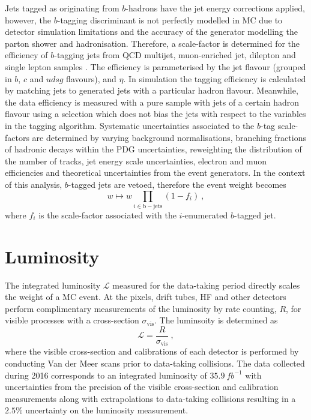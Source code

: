 Jets tagged as originating from $b$-hadrons have the jet energy corrections
applied, however, the $b$-tagging discriminant is not perfectly modelled in MC
due to detector simulation limitations and the accuracy of the generator
modelling the parton shower and hadronisation. Therefore, a scale-factor is
determined for the efficiency of $b$-tagging jets from QCD multijet,
muon-enriched jet, dilepton \Itt and single lepton \Itt samples
\cite{Sirunyan:2017ezt}. The efficiency is parameterised by the jet flavour
(grouped in $b$, $c$ and $udsg$ flavours), \pt and $\eta$. In simulation the
tagging efficiency is calculated by matching jets to generated jets with a
particular hadron flavour. Meanwhile, the data efficiency is measured with a
pure sample with jets of a certain hadron flavour using a selection which does
not bias the jets with respect to the variables in the tagging algorithm.
Systematic uncertainties associated to the $b$-tag scale-factors are
determined by varying background normalisations, branching fractions of
hadronic decays within the PDG uncertainties, reweighting the distribution of
the number of tracks, jet energy scale uncertainties, electron and muon
efficiencies and theoretical uncertainties from the event generators. In the
context of this analysis, $b$-tagged jets are vetoed, therefore the event
weight becomes
%
\begin{equation}
    w \mapsto w \prod_{i\in\mathrm{b-jets}} (1 - f_i)\ ,
\end{equation}
%
where $f_i$ is the scale-factor associated with the $i$-enumerated $b$-tagged
jet.


\section{Luminosity}

The integrated luminosity $\mathcal{L}$ measured for the data-taking period
directly scales the weight of a MC event. At \CMS the pixels, drift tubes, HF
and other detectors perform complimentary measurements of the luminosity by
rate counting, $R$, for visible processes with a cross-section
$\sigma_{\mathrm{vis}}$. The luminsoity is determined as
%
\begin{equation}
    \mathcal{L} = \frac{R}{\sigma_{\mathrm{vis}}}\ ,
\end{equation}
%
where the visible cross-section and calibrations of each detector is performed
by conducting Van der Meer scans \cite{vanderMeer:296752} prior to data-taking
collisions. The data collected during 2016 corresponds to an integrated
luminosity of ${\SI{35.9}{fb^{-1}}}$ with uncertainties from the precision of
the visible cross-section and calibration measurements along with
extrapolations to data-taking collisions resulting in a $2.5\%$ uncertainty
\cite{CMS:2017sdi} on the luminosity measurement.


